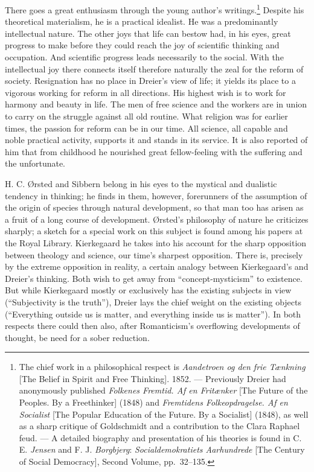 \documentclass[12pt,a4paper]{book}
\newcommand{\opage}[1]{\marginnote{\footnotesize\textit{[#1]}}}
\begin{document}
There goes a great enthusiasm through the young author's writings.\footnote{The chief work in
a philosophical respect is \emph{Aandetroen og den frie Tænkning} [The Belief in Spirit and
Free Thinking]. 1852. --- Previously Dreier had anonymously published \emph{Folkenes Fremtid.
Af en Fritænker} [The Future of the Peoples. By a Freethinker] (1848) and \emph{Fremtidens
Folkeopdragelse. Af en Socialist} [The Popular Education of the Future. By a Socialist]
(1848), as well as a sharp critique of Goldschmidt and a contribution to the Clara Raphael
feud. --- A detailed biography and presentation of his theories is found in C. E. \emph{Jensen} and
F. J. \emph{Borgbjerg}: \emph{Socialdemokratiets Aarhundrede} [The Century of Social Democracy],
Second Volume, pp.~32--135.} Despite his theoretical materialism, he is a practical idealist.
He was a predominantly intellectual nature. The other joys that life can bestow had, in his
eyes, great progress to make before they could reach the joy of scientific thinking and
occupation. And scientific progress leads necessarily to the social. With the intellectual
joy there connects itself therefore naturally the zeal for the reform of society. Resignation
has no place in Dreier's view of life; it yields its place to a vigorous working for reform
in all directions. His highest wish is to work for harmony and beauty in life. The men of
free science and the workers are in union to carry on the struggle against all old routine.
What religion was for earlier times, the passion for reform can be in our time. All science,
all capable and noble practical activity, supports it and stands in its service. It is also
reported of him that from childhood he nourished great fellow-feeling with the suffering and
the unfortunate.

H. C. Ørsted and Sibbern belong in his eyes to the mystical and dualistic tendency in
thinking; he finds in them, however, forerunners of the assumption of the origin of species
through natural development, so that man too has arisen as a fruit of a long course of
development. Ørsted's philosophy of nature he \opage{177}criticizes sharply; a sketch for a special work
on this subject is found among his papers at the Royal Library. Kierkegaard he takes into his
account for the sharp opposition between theology and science, our time's sharpest opposition.
There is, precisely by the extreme opposition in reality, a certain analogy between
Kierkegaard's and Dreier's thinking. Both wish to get away from ``concept-mysticism'' to
existence. But while Kierkegaard mostly or exclusively has the existing subjects in view
(``Subjectivity is the truth''), Dreier lays the chief weight on the existing objects
(``Everything outside us is matter, and everything inside us is matter''). In both respects
there could then also, after Romanticism's overflowing developments of thought, be need for a
sober reduction.
\end{document}
